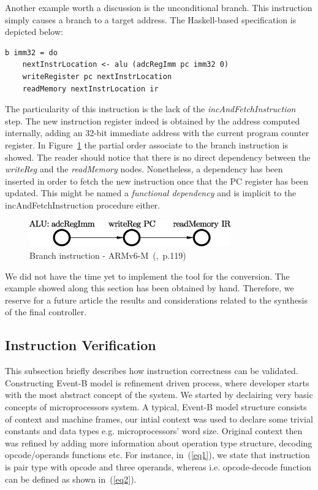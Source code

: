 \documentclass[conference]{IEEEtran}
\begin{document}
Another example worth a discussion is the unconditional branch. This
instruction simply causes a branch to a target address. The Haskell-based specification is
depicted below:\\

\begin{lstlisting}[caption=B instruction - Haskell-based specification,
frame=single, label=lis:and]
b imm32 = do
    nextInstrLocation <- alu (adcRegImm pc imm32 0)
    writeRegister pc nextInstrLocation
    readMemory nextInstrLocation ir
\end{lstlisting}

\noindent
The particularity of this instruction is the lack of the \textit{incAndFetchInstruction} step.
The new instruction register indeed is obtained by the address computed internally, adding an
32-bit immediate address with the current program counter register. In Figure~\ref{fig:bPO}
the partial order associate to the branch instruction is showed. The reader should notice that
there is no direct dependency between the \textit{writeReg} and the \textit{readMemory}
nodes. Nonetheless, a dependency has been inserted in order to fetch the new instruction once
that the PC register has been updated. This might be named a \textit{functional dependency}
and is implicit to the incAndFetchInstruction procedure either.

\begin{figure}[ht!]
\begin{center}
	\includegraphics[width=8.7cm]{IMG/b.eps}
	\caption{Branch instruction - ARMv6-M~(\cite{armManual},~p.119)}
	\label{fig:bPO}
\end{center}
\end{figure}

We did not have the time yet to implement the tool for the conversion.
The example showed along this section has been obtained by hand. Therefore, we reserve for a
future article the results and considerations related to the synthesis of the final
controller.

\subsection{Instruction Verification}

This subsection briefly describes how instruction correctness can be validated. Constructing Event-B model
is refinement driven process, where developer starts with the most abstract concept of the system. We
started by declairing very basic concepts of microprocessors system. A typical, Event-B model structure
consists of context and machine frames, our intial context was used to declare some trivial constants and
data types e.g.  microprocessors' word size. Original context then was refined by adding more information
about operation type structure, decoding opcode/operands functions etc. For instance, in~(\ref{eq1}),
we state that instruction is pair type with opcode and three operands, whereas i.e. opcode-decode function
can be defined as shown in~(\ref{eq2}).
\end{document}
